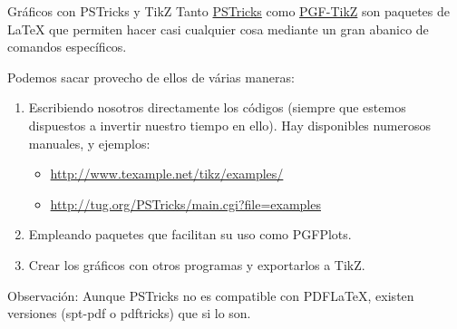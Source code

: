\documentclass{beamer}
\begin{document}
\begin{frame}{Gr\'aficos con PSTricks y TikZ}
Tanto \href{http://www.ctan.org/pkg/pstricks}{PSTricks} como \href{http://www.texample.net/tikz/}{PGF-TikZ} son paquetes de LaTeX que permiten hacer casi cualquier cosa mediante un gran abanico de comandos espec\'ificos.

Podemos sacar provecho de ellos de v\'arias maneras:
\begin{enumerate}
\item Escribiendo nosotros directamente los c\'odigos (siempre que estemos dispuestos a invertir nuestro tiempo en ello). Hay disponibles numerosos manuales, y ejemplos:
\begin{itemize}
\item \href{http://www.texample.net/tikz/examples/}{http://www.texample.net/tikz/examples/}
\item \href{http://tug.org/PSTricks/main.cgi?file=examples}{http://tug.org/PSTricks/main.cgi?file=examples}
\end{itemize}
\item Empleando paquetes que facilitan su uso como PGFPlots.
\item Crear los gr\'aficos con otros programas y exportarlos a TikZ.
\end{enumerate}


\vspace{0.5cm}
{\small Observaci\'on:
Aunque PSTricks no es compatible con PDFLaTeX, existen versiones (spt-pdf o pdftricks)
que si lo son.}
\end{frame}
\end{document}
